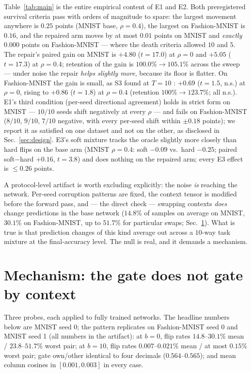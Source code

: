 \documentclass[review,12pt,number]{elsarticle}
\begin{document}
Table~\ref{tab:main} is the entire empirical content of E1 and E2.
Both preregistered survival criteria pass with orders of magnitude to
spare: the largest movement anywhere is $0.25$ points (MNIST base,
$\rho{=}0.4$), the largest on Fashion-MNIST is $0.16$, and the repaired
arm moves by at most $0.01$ points on MNIST and \emph{exactly} $0.000$
points on Fashion-MNIST --- where the death criteria allowed $10$ and
$5$. The repair's paired gain on MNIST is $+4.80$ ($t{=}17.0$) at
$\rho{=}0$ and $+5.05$ ($t{=}17.3$) at $\rho{=}0.4$; retention of the
gain is $100.0\% \to 105.1\%$ across the sweep --- under noise the
repair \emph{helps slightly more}, because its floor is flatter.
On Fashion-MNIST the gain is small, as S3 found at $T{=}10$
\cite{zhou2026repair}: $+0.69$ ($t{=}1.5$, n.s.) at $\rho{=}0$, rising
to $+0.86$ ($t{=}1.8$) at $\rho{=}0.4$ (retention $100\% \to 123.7\%$;
all n.s.). E1's third condition (per-seed directional agreement) holds
in strict form on MNIST --- $10/10$ seeds shift negatively at every
$\rho$ --- and fails on Fashion-MNIST ($8/10$, $9/10$, $7/10$ negative,
with every per-seed shift within $\pm 0.18$ points); we report it as
satisfied on one dataset and not on the other, as disclosed in
Sec.~\ref{sec:design}. E3's soft mixture tracks the oracle slightly
more closely than hard flips on the base arm (MNIST $\rho{=}0.4$: soft
$-0.09$ vs.\ hard $-0.25$; paired soft$-$hard $+0.16$, $t{=}3.8$) and
does nothing on the repaired arm; every E3 effect is ${\le} 0.26$
points.

A protocol-level artifact is worth excluding explicitly: the noise
\emph{is} reaching the network. Per-seed corruption patterns are fixed,
the context tensor is modified before the forward pass, and --- the
direct check --- swapping contexts \emph{does} change predictions in the
base network ($14.8\%$ of samples on average on MNIST, $30.1\%$ on
Fashion-MNIST, up to $51.7\%$ for particular swaps;
Sec.~\ref{sec:mech}). What is true is that prediction changes of this
kind average out across a $10$-way task mixture at the final-accuracy
level. The null is real, and it demands a mechanism.

\section{Mechanism: the gate does not gate by context}
\label{sec:mech}

Three probes, each applied to fully trained networks. The headline
numbers below are MNIST seed 0; the pattern replicates on Fashion-MNIST
seed 0 and MNIST seed 1 (all numbers in the artifact): at $b{=}0$,
flip rates $14.8$--$30.1\%$ mean / $23.8$--$51.7\%$ worst pair; at
$b{=}10$, flip rates $0.007$--$0.021\%$ mean / at most $0.15\%$ worst
pair; gate own/other identical to four decimals ($0.564$--$0.565$); and
mean column cosines in $[0.001, 0.003]$ in every case.
\end{document}
